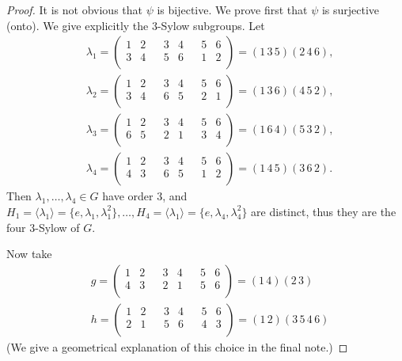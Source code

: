 \documentclass[11pt,a4paper]{article}
\begin{document}
\begin{proof}
It is not obvious that $\psi$ is bijective. We prove first that $\psi$ is surjective (onto). We give explicitly the $3$-Sylow subgroups. Let
\begin{align*}
&\lambda_1 = 
\left(
\begin{array}{cccccccc}
1 & 2 & & 3 & 4 & & 5 & 6\\
 3&4&&5&6&&1&2 \\
\end{array}
\right) = (1\,3\,5)(2\,4\,6),\\
&\lambda_2 = 
\left(
\begin{array}{cccccccc}
1 & 2 & & 3 & 4 & & 5 & 6\\
 3&4&&6&5&&2&1 \\
\end{array}
\right) = (1\,3\,6)(4\,5\,2),\\
&\lambda_3 = 
\left(
\begin{array}{cccccccc}
1 & 2 & & 3 & 4 & & 5 & 6\\
 6&5&&2&1&&3&4 \\
\end{array}
\right) = (1\,6\,4)(5\,3\,2),\\
&\lambda_4 =
\left(
\begin{array}{cccccccc}
1 & 2 & & 3 & 4 & & 5 & 6\\
 4&3&&6&5&&1&2 \\
\end{array}
\right) = (1\,4\,5)(3\,6\,2).
\end{align*}
Then $\lambda_1,\ldots,\lambda_4 \in G$ have order $3$, and $H_1 = \langle \lambda_1 \rangle = \{e,\lambda_1,\lambda_1^2\},\ldots,H_4 = \langle \lambda_1 \rangle = \{e,\lambda_4,\lambda_4^2\}$ are distinct, thus they are the four $3$-Sylow of $G$.

Now take 
\begin{align*}
&g = 
\left(
\begin{array}{cccccccc}
1 & 2 & & 3 & 4 & & 5 & 6\\
 4&3&&2&1&&5&6 \\
\end{array}
\right) = (1\,4)(2\,3)\\
&h=
\left(
\begin{array}{cccccccc}
1 & 2 & & 3 & 4 & & 5 & 6\\
 2&1&&5&6&&4&3 \\
\end{array}
\right) = (1\,2)(3\,5\,4\,6)
\end{align*}
(We give a geometrical explanation of this choice in the final note.)


\end{proof}
\end{document}
